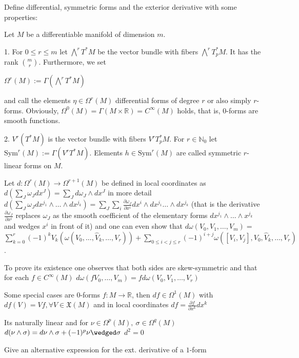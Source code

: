 Define differential, symmetric forms and the exterior derivative with some properties:

Let \(M\) be a differentiable manifold of dimension \(m\).

1. For \(0 \leq r \leq m\) let \(\bigwedge^r T^*M\) be the vector bundle with fibers \(\bigwedge^r T_p^*M\). 
It has the rank \(\binom{m}{r}\). Furthermore, we set 

\(\Omega^r(M) := \Gamma \left( \bigwedge^r T^*M \right)\)

and call the elements \(\eta \in \Omega^r(M)\) differential forms of degree \(r\) or also simply \(r\)-forms. 
Obviously, \(\Omega^0(M) = \Gamma(M \times \mathbb{R}) = C^\infty(M)\) holds, that is, 0-forms are smooth functions.

2. \(V^r(T^*M)\) is the vector bundle with fibers \(V^r T_p^*M\). For \(r \in \mathbb{N}_0\) let
\(\text{Sym}^r(M) := \Gamma \left( V^r T^*M \right).\)
Elements \(h \in \text{Sym}^r(M)\) are called symmetric \(r\)-linear forms on \(M\).

Let  \( d : \Omega^r(M) \to \Omega^{r+1}(M) \) be defined in local coordinates as
\( d( \sum_{J} \omega_J dx^J ) = \sum_{J} d\omega_J \wedge dx^J \)
in more detail
\( d(\sum_J \omega_J dx^{j_1} \wedge \dots \wedge dx^{j_k}) = \sum_{J} \sum_{i} \frac{\partial \omega_J}{\partial x^i} dx^i \wedge dx^{j_1} \dots \wedge dx^{j_k} \)
(that is the derivative \( \frac{\partial \omega_J}{\partial x^i} \) replaces \( \omega_J \) as the smooth coefficient of the elementary forms \( dx^{j_1} \wedge \dots \wedge x^{j_k} \)
and wedges \( x^i \) in front of it)
and one can even show that
\( d\omega(V_0, V_1, \dots, V_m) =\)
\(\sum_{k=0}^r (-1)^k V_k(\omega(V_0, \dots, \hat{V}_k, \dots, V_r)) + \sum_{0 \leq i < j \leq r} (-1)^{i+j}\omega([V_i, V_j], V_0, \hat{V}_k, \dots, V_r) \).


To prove its existence one observes that both sides are skew-symmetric and that for each \( f \in C^\infty(M) \)
\( d\omega(fV_0, \dots, V_m) = fd\omega(V_0, V_1, \dots, V_r) \)

Some special cases are \( 0 \)-forms \( f : M \to \mathbb{R} \), then \( df \in \Omega^1(M) \) with
\( df(V) = Vf, \forall V \in \mathfrak{X}(M) \)
and in local coordinates \( df =  \frac{\partial f}{\partial x^k} dx^k \)

Its naturally linear
and for \( \nu \in \Omega^p(M),\ \sigma \in \Omega^{q}(M)\)
\( d(\nu \wedge \sigma) = d\nu \wedge \sigma + (-1)^p\nu\wedged\sigma \)
\( d^2 = 0 \)

Give an alternative expression for the ext. derivative of a \( 1 \)-form

